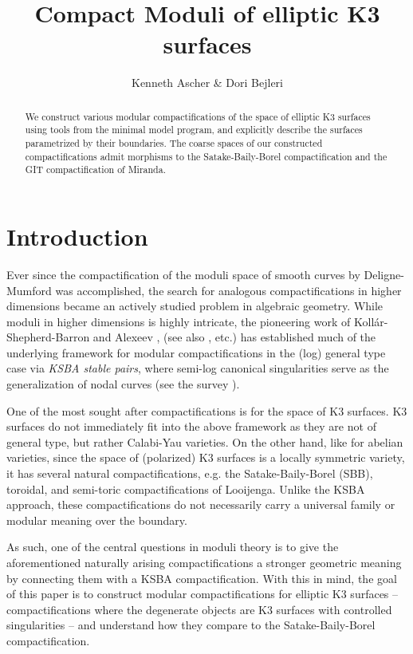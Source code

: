 \documentclass[11pt]{amsart}
\title{Compact Moduli of elliptic K3 surfaces}
\author{Kenneth Ascher \& Dori Bejleri}
\theoremstyle{definition}
\theoremstyle{remark}
\begin{document}
	
	\maketitle
	
	\begin{abstract}
		We construct various modular compactifications of the space of elliptic K3 surfaces using tools from the minimal model program, and explicitly describe the surfaces parametrized by their boundaries. The coarse spaces of our constructed compactifications admit morphisms to the Satake-Baily-Borel compactification and the GIT compactification of Miranda.
	\end{abstract}
	
	\section{Introduction}
	
	
	
	Ever since the compactification of the moduli space of smooth curves by Deligne-Mumford was accomplished, the search for analogous compactifications in higher dimensions became an actively studied problem in algebraic geometry. While moduli in higher dimensions is highly intricate, the pioneering work of Koll\'ar-Shepherd-Barron \cite{ksb} and Alexeev \cite{boundedness}, (see also \cite{hx1, hmx, kp, kolmodbook}, etc.) has established much of the underlying framework for modular compactifications in the (log) general type case via \emph{KSBA stable pairs}, where semi-log canonical singularities serve as the generalization of nodal curves (see the survey \cite{kollarmumford}).
	
	
	One of the most sought after compactifications is for the space of K3 surfaces. K3 surfaces do not immediately fit into the above framework as they are not of general type, but rather Calabi-Yau varieties. On the other hand, like for abelian varieties, since the space of (polarized) K3 surfaces is a locally symmetric variety, it has several natural compactifications, e.g. the Satake-Baily-Borel (SBB), toroidal, and semi-toric compactifications of Looijenga. Unlike the KSBA approach, these compactifications do not necessarily carry a universal family or modular meaning over the boundary. 
	
	As such, one of the central questions in moduli theory is to give the aforementioned naturally arising compactifications a stronger geometric meaning by connecting them with a KSBA compactification. With this in mind, the goal of this paper is to construct modular compactifications for elliptic K3 surfaces -- compactifications where the degenerate objects are K3 surfaces with controlled singularities -- and understand how they compare to the Satake-Baily-Borel compactification. 
	
\end{document}

